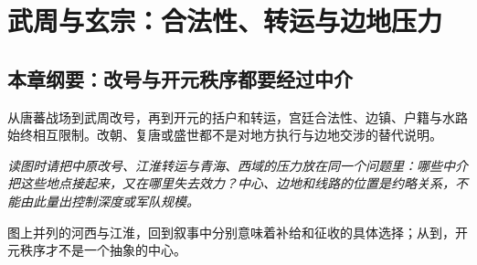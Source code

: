 \chapter{武周与玄宗：合法性、转运与边地压力}
\label{ch:wu-zhou-xuanzong}
\section{本章纲要：改号与开元秩序都要经过中介}
从唐蕃战场到武周改号，再到开元的括户和转运，宫廷合法性、边镇、户籍与水路始终相互限制。改朝、复唐或盛世都不是对地方执行与边地交涉的替代说明。



\noindent\textit{读图时请把中原改号、江淮转运与青海、西域的压力放在同一个问题里：哪些中介把这些地点接起来，又在哪里失去效力？中心、边地和线路的位置是约略关系，不能由此量出控制深度或军队规模。}

\noindent 图上并列的河西与江淮，回到叙事中分别意味着补给和征收的具体选择；从到，开元秩序才不是一个抽象的中心。

